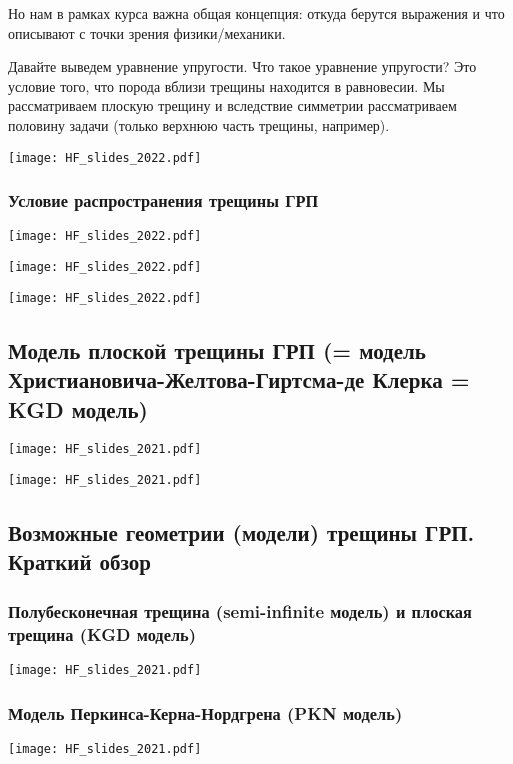\documentclass[main.tex]{subfiles}
\begin{document}
Но нам в рамках курса важна общая концепция: откуда берутся выражения и что описывают с точки зрения физики/механики.

Давайте выведем уравнение упругости.
Что такое уравнение упругости?
Это условие того, что порода вблизи трещины находится в равновесии.
Мы рассматриваем плоскую трещину и вследствие симметрии рассматриваем половину задачи (только верхнюю часть трещины, например).

\texttt{[image: HF\_slides\_2022.pdf]}

\subsubsection{Условие распространения трещины ГРП}

\texttt{[image: HF\_slides\_2022.pdf]}

\texttt{[image: HF\_slides\_2022.pdf]}

\texttt{[image: HF\_slides\_2022.pdf]}

\subsection{Модель плоской трещины ГРП (= модель Христиановича-Желтова-Гиртсма-де Клерка = KGD модель)}

\texttt{[image: HF\_slides\_2021.pdf]}

\texttt{[image: HF\_slides\_2021.pdf]}

\subsection{Возможные геометрии (модели) трещины ГРП. Краткий обзор}

\subsubsection{Полубесконечная трещина (semi-infinite модель) и плоская трещина (KGD модель)}

\texttt{[image: HF\_slides\_2021.pdf]}

\subsubsection{Модель Перкинса-Керна-Нордгрена (PKN модель)}

\texttt{[image: HF\_slides\_2021.pdf]}
\end{document}

